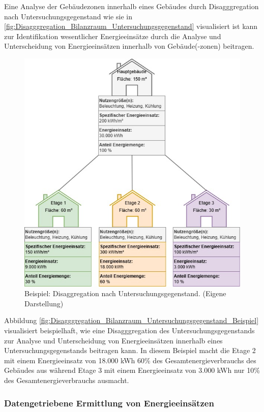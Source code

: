 Eine Analyse der Gebäudezonen innerhalb eines Gebäudes durch Disagggregation nach Untersuchungsgegenstand wie sie in 
\eqref{fig:Disagggregation_Bilanzraum_Untersuchungsgegenstand} visualisiert ist kann zur Identifikation wesentlicher Energieeinsätze durch die Analyse und Unterscheidung 
von Energieeinsätzen innerhalb von Gebäude(-zonen) beitragen.
\begin{figure}[H]
    \centering
    \includegraphics[width=1\textwidth]{../../Ressourcen/Abbildungen/Untersuchungsgegenstand_Zerlegt_Beispiel.jpg}
    \caption{Beispiel: Disaggregation nach Untersuchungsgegenstand. (Eigene Darstellung)}
    \label{fig:Disagggregation_Bilanzraum_Untersuchungsgegenstand_Beispiel}
\end{figure}
Abbildung \eqref{fig:Disagggregation_Bilanzraum_Untersuchungsgegenstand_Beispiel} visualisiert beispielhaft, wie eine Disagggregation des Untersuchungsgegenstands 
zur Analyse und Unterscheidung von Energieeinsätzen innerhalb eines Untersuchungsgegenstands beitragen kann.
In diesem Beispiel macht die Etage 2 mit einem Energieeinsatz von 18.000 kWh 60\% des Gesamtenergieverbrauchs des Gebäudes aus während Etage 3 mit 
einem Energieeinsatz von 3.000 kWh nur 10\% des Gesamtenergieverbrauchs ausmacht.

\subsubsection{Datengetriebene Ermittlung von Energieeinsätzen}

